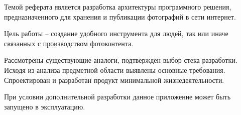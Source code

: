 
Темой реферата является разработка архитектуры программного решения, предназначенного для хранения и публикации фотографий в сети интернет.

Цель работы – создание удобного инструмента для людей, так или иначе связанных с производством фотоконтента.

Рассмотрены существующие аналоги, подтвержден выбор стека разработки. 
Исходя из анализа предметной области выявлены основные требования. 
Спроектирован и разработан продукт минимальной жизнедеятельности.

При условии дополнительной разработки данное приложение может быть запущено в эксплуатацию.